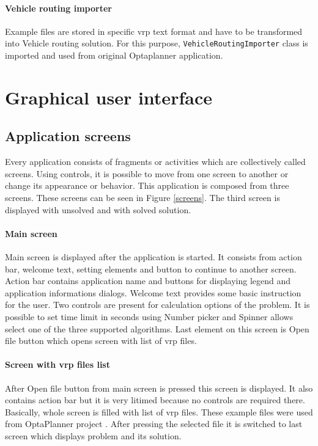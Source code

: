 \paragraph{Vehicle routing importer}
Example files are stored in specific vrp text format and have to be transformed into Vehicle routing solution. For this
purpose, \texttt{VehicleRoutingImporter} class is imported and used from original Optaplanner application.

\section{Graphical user interface}\label{guiSection}

\subsection{Application screens}
Every application consists of fragments or activities which are collectively called screens. Using controls, it is
possible to move from one screen to another or change its appearance or behavior. This application is composed from
three screens. These screens can be seen in Figure \ref{screens}. The third screen is displayed with unsolved and with
solved solution.

\paragraph{Main screen}
Main screen is displayed after the application is started. It consists from action bar, welcome text, setting elements
and button to continue to another screen. Action bar contains application name and buttons for displaying legend and
application informations dialogs. Welcome text provides some basic instruction for the user. Two controls are present
for calculation options of the problem. It is possible to set time limit in seconds using Number picker and Spinner
allows select one of the three supported algorithms. Last element on this screen is Open file button which opens screen
with list of vrp files.

\paragraph{Screen with vrp files list} After Open file button from main screen is pressed this screen is displayed. It
also contains action bar but it is very litimed because no controls are required there. Basically, whole screen is
filled with list of vrp files. These example files were used from OptaPlanner project \cite{OptaPlannerPages}. After
pressing the selected file it is switched to last screen which displays problem and its solution.

